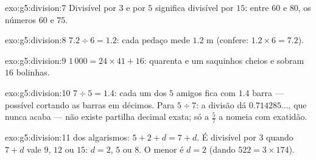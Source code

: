 \begin{solution}{exo:g5:division:7}
Divisível por $3$ e por $5$ significa divisível por $15$: entre $60$
e $80$, os números $60$ e $75$.
\end{solution}

\begin{solution}{exo:g5:division:8}
$7.2 \div 6 = 1.2$: cada pedaço mede $1.2$ m (confere:
$1.2 \times 6 = 7.2$).
\end{solution}

\begin{solution}{exo:g5:division:9}
$1\,000 = 24 \times 41 + 16$: quarenta e um saquinhos cheios e
sobram $16$ bolinhas.
\end{solution}

\begin{solution}{exo:g5:division:10}
$7 \div 5 = 1.4$: cada um dos $5$ amigos fica com $1.4$ barra ---
possível cortando as barras em décimos. Para $5 \div 7$: a divisão dá
$0.714285\dots$, que nunca acaba --- não existe partilha decimal
exata; só a  $\frac57$ a nomeia com exatidão.
\end{solution}

\begin{solution}{exo:g5:division:11}
 dos algarismos: $5 + 2 + d = 7 + d$. É divisível por $3$ quando
$7 + d$ vale $9$, $12$ ou $15$: $d = 2$, $5$ ou $8$. O menor é
$d = 2$ (dando $522 = 3 \times 174$).
\end{solution}
